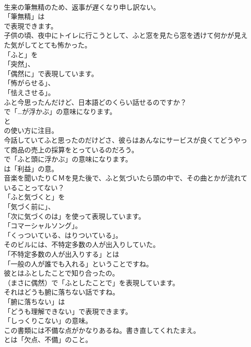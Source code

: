 \documentclass[8pt]{extreport}
\begin{document}
\begin{CJK}{UTF8}{min}
\\	生来の筆無精のため、返事が遅くなり申し訳ない。 
\\	「筆無精」は
\\	で表現できます。	
\\	子供の頃、夜中にトイレに行こうとして、ふと窓を見たら窓を透けて何かが見えた気がしてとても怖かった。 
\\	「ふと」を
\\	「突然」、
\\	「偶然に」で表現しています。
\\	「怖がらせる」、
\\	「怯えさせる」。	
\\	ふと今思ったんだけど、日本語どのくらい話せるのですか？ 
\\	で「…が浮かぶ」の意味になります。
\\	と 
\\	の使い方に注目。	
\\	今話していてふと思ったのだけどさ、彼らはあんなにサービスが良くてどうやって商品の売上の採算をとっているのだろう。 
\\	で「ふと頭に浮かぶ」の意味になります。
\\	は「利益」の意。	
\\	音楽を聞いたりＣＭを見た後で、ふと気づいたら頭の中で、その曲とかが流れていることってない？ 
\\	「ふと気づくと」を
\\	「気づく前に」、
\\	「次に気づくのは」を使って表現しています。
\\	「コマーシャルソング」。
\\	「くっついている、はりついている」。	
\\	そのビルには、不特定多数の人が出入りしていた。 
\\	「不特定多数の人が出入りする」とは
\\	「一般の人が誰でも入れる」ということですね。	
\\	彼とはふとしたことで知り合ったの。 
\\	（まさに偶然）で「ふとしたことで」を表現しています。	
\\	それはどうも腑に落ちない話ですね。 
\\	「腑に落ちない」は
\\	「どうも理解できない」で表現できます。
\\	「しっくりこない」の意味。	
\\	この書類には不備な点がかなりあるね。書き直してくれたまえ。 
\\	とは「欠点、不備」のこと。

\end{CJK}
\end{document}
